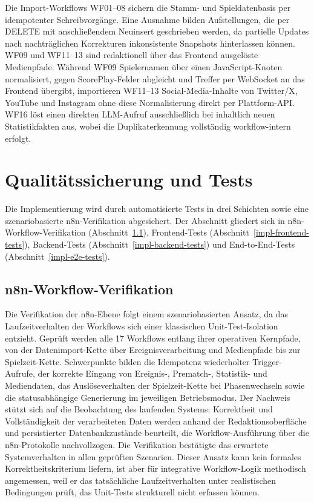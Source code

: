 Die Import-Workflows WF01–08 sichern die Stamm- und Spieldatenbasis per idempotenter Schreibvorgänge. Eine Ausnahme bilden Aufstellungen, die per DELETE mit anschließendem Neuinsert geschrieben werden, da partielle Updates nach nachträglichen Korrekturen inkonsistente Snapshots hinterlassen können. WF09 und WF11–13 sind redaktionell über das Frontend ausgelöste Medienpfade. Während WF09 Spielernamen über einen JavaScript-Knoten normalisiert, gegen ScorePlay-Felder abgleicht und Treffer per WebSocket an das Frontend übergibt, importieren WF11–13 Social-Media-Inhalte von Twitter/X, YouTube und Instagram ohne diese Normalisierung direkt per Plattform-API. WF16 löst einen direkten LLM-Aufruf ausschließlich bei inhaltlich neuen Statistikfakten aus, wobei die Duplikaterkennung vollständig workflow-intern erfolgt.


\section{Qualitätssicherung und Tests}\label{qualituxe4tssicherung-und-tests}

Die Implementierung wird durch automatisierte Tests in drei Schichten sowie eine szenariobasierte n8n-Verifikation abgesichert. Der Abschnitt gliedert sich in n8n-Workflow-Verifikation (Abschnitt~\ref{impl-n8n-verifikation}), Frontend-Tests (Abschnitt~\ref{impl-frontend-tests}), Backend-Tests (Abschnitt~\ref{impl-backend-tests}) und End-to-End-Tests (Abschnitt~\ref{impl-e2e-tests}).

\subsection{n8n-Workflow-Verifikation}\label{impl-n8n-verifikation}

Die Verifikation der n8n-Ebene folgt einem szenariobasierten Ansatz, da das Laufzeitverhalten der Workflows sich einer klassischen Unit-Test-Isolation entzieht. Geprüft werden alle 17 Workflows entlang ihrer operativen Kernpfade, von der Datenimport-Kette über Ereignisverarbeitung und Medienpfade bis zur Spielzeit-Kette. Schwerpunkte bilden die Idempotenz wiederholter Trigger-Aufrufe, der korrekte Eingang von Ereignis-, Prematch-, Statistik- und Mediendaten, das Auslöseverhalten der Spielzeit-Kette bei Phasenwechseln sowie die statusabhängige Generierung im jeweiligen Betriebsmodus. Der Nachweis stützt sich auf die Beobachtung des laufenden Systems: Korrektheit und Vollständigkeit der verarbeiteten Daten werden anhand der Redaktionsoberfläche und persistierter Datenbankzustände beurteilt, die Workflow-Ausführung über die n8n-Protokolle nachvollzogen. Die Verifikation bestätigte das erwartete Systemverhalten in allen geprüften Szenarien. Dieser Ansatz kann kein formales Korrektheitskriterium liefern, ist aber für integrative Workflow-Logik methodisch angemessen, weil er das tatsächliche Laufzeitverhalten unter realistischen Bedingungen prüft, das Unit-Tests strukturell nicht erfassen können.

